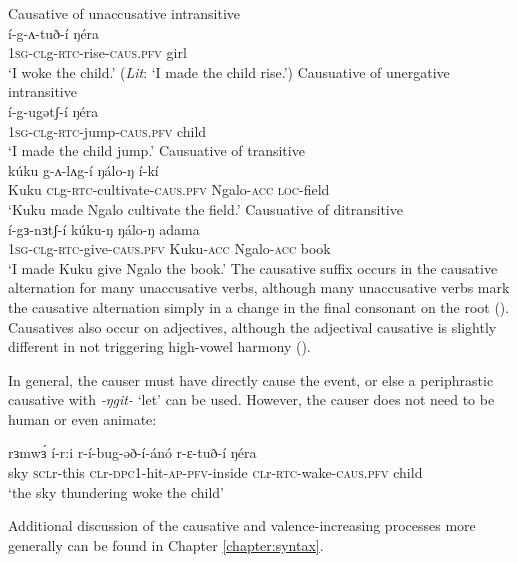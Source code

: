 \ea Causative of unaccusative intransitive\\
	\gll   í-g-ʌ-tuð-í ŋéra \\
		\textsc{1sg-cl}g-\textsc{rtc}-rise-\textsc{caus.pfv} girl\\
	\glt 	 `I woke the child.' (\textit{Lit}: `I made the child rise.')
\ex  Causuative of unergative intransitive\\
 	\gll í-g-ugətʃ-í  ŋéra \\
 		\textsc{1sg-cl}g-\textsc{rtc}-jump-\textsc{caus.pfv} child\\
	\glt  `I made the child jump.'
\ex  Causuative of transitive\\
 	\gll kúku g-ʌ-lʌg-í ŋálo-ŋ í-kí			 \\
 	Kuku \textsc{cl}g-\textsc{rtc}-cultivate-\textsc{caus.pfv} Ngalo-\textsc{acc} \textsc{loc}-field \\
 	\glt  `Kuku made Ngalo cultivate the field.'
\ex  Causuative of ditransitive\\
 	\gll í-gɜ-nɜtʃ-í kúku-ŋ ŋálo-ŋ adama			 \\
 	\textsc{1sg-cl}g-\textsc{rtc}-give-\textsc{caus.pfv} Kuku-\textsc{acc} Ngalo-\textsc{acc} book \\
 	\glt  `I made Kuku give Ngalo the book.'
 \z 
The causative suffix occurs in the causative alternation for many unaccusative verbs, although many unaccusative verbs mark the causative alternation simply in a change in the final consonant on the root ().  Causatives also occur on adjectives, although the adjectival causative is slightly different in not triggering high-vowel harmony ().

In general, the causer must have directly cause the event, or else a periphrastic causative with \textit{-ŋgit-} `let' can be used. However, the causer does not need to be human or even animate:

\ea \gll rɜmwɜ́  í-r:i r-í-bug-əð-í-ánó r-ɛ-tuð-í ŋéra \\
sky \textsc{scl}r-this  \textsc{cl}r-\textsc{dpc1}-hit-\textsc{ap}-\textsc{pfv}-inside \textsc{cl}r-\textsc{rtc}-wake-\textsc{caus.pfv} child\\
`the sky thundering woke the child' 
\z 

Additional discussion of the causative and valence-increasing processes more generally can be found in Chapter \ref{chapter:syntax}.

%
%
%
%
%
%


